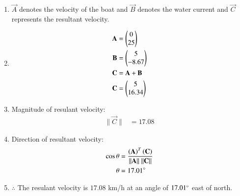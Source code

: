 \renewcommand{\theequation}{\theenumi}
\begin{enumerate}

\item \begin{flushleft}
 $\vec{A}$ denotes the velocity of the boat and $
\vec{B}$ denotes the water current and $\vec{C}$ represents the resultant velocity. 
\end{flushleft}

\item \begin{align}
\mathbf{A} &=\begin{pmatrix}0\\25\end{pmatrix} \label{eq:constr_a_motion_in_a_plane}\\
\mathbf{B} &=\begin{pmatrix}5\\-8.67\end{pmatrix} \label{eq:constr_b_motion_in_a_plane}\\
\mathbf{C} &= \mathbf{A} + \mathbf{B}\\
\mathbf{C} &= \begin{pmatrix}5\\16.34\end{pmatrix}
\end{align}

\item Magnitude of resulant velocity:
\begin{align}
\| \vec{C} \| &= 17.08
\end{align}

\item Direction of resultant velocity:
\begin{align}
\cos{\theta} &= \frac{\brak{\vec{A}}^T\brak{\vec{C}}}{\| \vec{A} \|\ \| \vec{C} \|}\\
\theta &= 17.01\degree
\end{align}

\item \begin{flushleft}
$\therefore$ The resulant velocity is $17.08$ km/h at an angle of $17.01\degree$ east of north.
\end{flushleft}


\end{enumerate}
